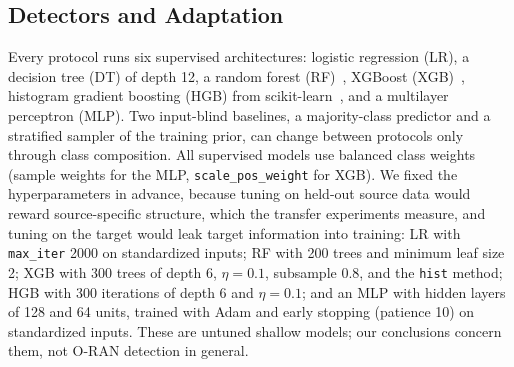 \begin{table}[t]
\caption{Shared flow feature space. Byte columns hold IP-layer bytes: for 5G-NIDD (Argus) and the 5G core testbed (NFStream), 14 bytes of Ethernet header per packet are removed, and for tunneled NFStream packets also 44 bytes of GTP-U encapsulation. The exporter-robust subset is the protocol one-hot, the three mean packet sizes, and the two direction ratios.}
\label{tab:features}
\centering
\scriptsize
\setlength{\tabcolsep}{3pt}

\end{table}

\subsection{Detectors and Adaptation}
\label{sec:detectors}

Every protocol runs six supervised architectures: logistic regression (LR), a decision tree (DT) of depth 12, a random forest (RF)~\cite{breiman2001random}, XGBoost (XGB)~\cite{chen2016xgboost}, histogram gradient boosting (HGB) from scikit-learn~\cite{pedregosa2011scikit}, and a multilayer perceptron (MLP). Two input-blind baselines, a majority-class predictor and a stratified sampler of the training prior, can change between protocols only through class composition. All supervised models use balanced class weights (sample weights for the MLP, \texttt{scale\_pos\_weight} for XGB). We fixed the hyperparameters in advance, because tuning on held-out source data would reward source-specific structure, which the transfer experiments measure, and tuning on the target would leak target information into training: LR with \texttt{max\_iter} 2000 on standardized inputs; RF with 200 trees and minimum leaf size 2; XGB with 300 trees of depth 6, $\eta=0.1$, subsample 0.8, and the \texttt{hist} method; HGB with 300 iterations of depth 6 and $\eta=0.1$; and an MLP with hidden layers of 128 and 64 units, trained with Adam and early stopping (patience 10) on standardized inputs. These are untuned shallow models; our conclusions concern them, not O-RAN detection in general.

